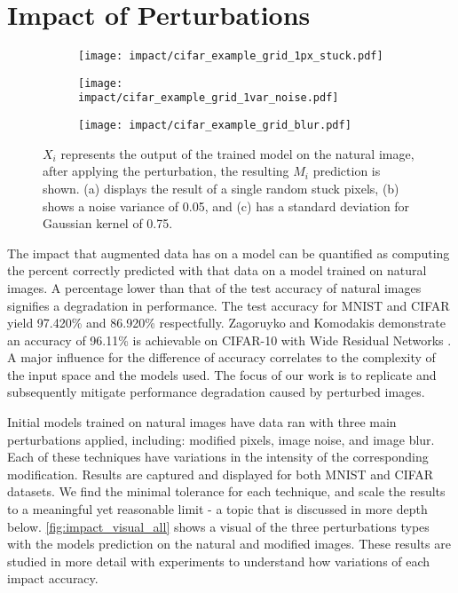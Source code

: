 \documentclass[conference]{IEEEtran}
\begin{document}
\section{Impact of Perturbations}
\label{sec:impact_of_perturb}

\begin{figure*}[!t]
    \centering
    \begin{subfigure}{0.31\linewidth}
        \centering
        \texttt{[image: impact/cifar\_example\_grid\_1px\_stuck.pdf]}
        \caption{}
        \label{fig:impact_visual_blur}
    \end{subfigure}
    \begin{subfigure}{0.34\linewidth}
        \centering
        \texttt{[image: impact/cifar\_example\_grid\_1var\_noise.pdf]}
        \caption{}
        \label{fig:impact_visual_noise}
    \end{subfigure}
        \begin{subfigure}{0.31\linewidth}
        \centering
        \texttt{[image: impact/cifar\_example\_grid\_blur.pdf]}
        \caption{}
        \label{fig:impact_visual_pixel}
    \end{subfigure}
    \captionsetup{width=0.90\linewidth}
    \caption{$X_i$ represents the output of the trained model on the natural image, after applying the perturbation, the resulting $M_i$ prediction is shown. (a) displays the result of a single random stuck pixels, (b) shows a noise variance of 0.05, and (c) has a standard deviation for Gaussian kernel of 0.75.}
    \label{fig:impact_visual_all}
\end{figure*}

The impact that augmented data has on a model can be quantified as computing the percent correctly predicted with that data on a model trained on natural images. A percentage lower than that of the test accuracy of natural images signifies a degradation in performance. The test accuracy for MNIST and CIFAR yield 97.420\% and 86.920\% respectfully. Zagoruyko and Komodakis demonstrate an accuracy of 96.11\% is achievable on CIFAR-10 with Wide Residual Networks \cite{Zagoruyko2016wideresnet}. A major influence for the difference of accuracy correlates to the complexity of the input space and the models used. The focus of our work is to replicate and subsequently mitigate performance degradation caused by perturbed images.

Initial models trained on natural images have data ran with three main perturbations applied, including: modified pixels, image noise, and image blur. Each of these techniques have variations in the intensity of the corresponding modification. Results are captured and displayed for both MNIST and CIFAR datasets. We find the minimal tolerance for each technique, and scale the results to a meaningful yet reasonable limit - a topic that is discussed in more depth below. \autoref{fig:impact_visual_all} shows a visual of the three perturbations types with the models prediction on the natural and modified images. These results are studied in more detail with experiments to understand how variations of each impact accuracy.
\end{document}
